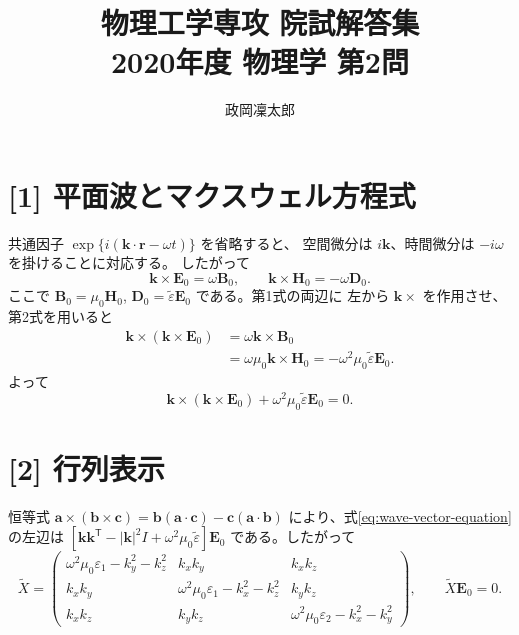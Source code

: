 \documentclass[11pt,a4paper]{article}
\title{物理工学専攻 院試解答集\\2020年度 物理学 第2問}
\author{政岡凜太郎}
\date{}
\begin{document}
\maketitle

\section*{[1] 平面波とマクスウェル方程式}
共通因子 $\exp\{i(\boldsymbol{k}\cdot\boldsymbol{r}-\omega t)\}$ を省略すると、
空間微分は $i\boldsymbol{k}$、時間微分は $-i\omega$ を掛けることに対応する。
したがって
\begin{equation}
  \boldsymbol{k}\times\boldsymbol{E}_0=\omega\boldsymbol{B}_0,
  \qquad
  \boldsymbol{k}\times\boldsymbol{H}_0=-\omega\boldsymbol{D}_0.
  \label{eq:maxwell-wave}
\end{equation}
ここで $\boldsymbol{B}_0=\mu_0\boldsymbol{H}_0$,
$\boldsymbol{D}_0=\tilde{\varepsilon}\boldsymbol{E}_0$ である。第1式の両辺に
左から $\boldsymbol{k}\times$ を作用させ、第2式を用いると
\begin{align}
 \boldsymbol{k}\times(\boldsymbol{k}\times\boldsymbol{E}_0)
 &=\omega\boldsymbol{k}\times\boldsymbol{B}_0\\
 &=\omega\mu_0\boldsymbol{k}\times\boldsymbol{H}_0
 =-\omega^2\mu_0\tilde{\varepsilon}\boldsymbol{E}_0.
\end{align}
よって
\begin{equation}
  \boldsymbol{k}\times(\boldsymbol{k}\times\boldsymbol{E}_0)
  +\omega^2\mu_0\tilde{\varepsilon}\boldsymbol{E}_0=0.
  \label{eq:wave-vector-equation}
\end{equation}

\section*{[2] 行列表示}
恒等式 $\boldsymbol{a}\times(\boldsymbol{b}\times\boldsymbol{c})
=\boldsymbol{b}(\boldsymbol{a}\cdot\boldsymbol{c})-\boldsymbol{c}(\boldsymbol{a}\cdot\boldsymbol{b})$
により、式\eqref{eq:wave-vector-equation}の左辺は
$[\boldsymbol{k}\boldsymbol{k}^{\mathsf T}-|\boldsymbol{k}|^2I+\omega^2\mu_0\tilde{\varepsilon}]\boldsymbol{E}_0$
である。したがって
\begin{equation}
 \tilde X=
 \begin{pmatrix}
  \omega^2\mu_0\varepsilon_1-k_y^2-k_z^2&k_xk_y&k_xk_z\\
  k_xk_y&\omega^2\mu_0\varepsilon_1-k_x^2-k_z^2&k_yk_z\\
  k_xk_z&k_yk_z&\omega^2\mu_0\varepsilon_2-k_x^2-k_y^2
 \end{pmatrix},
 \qquad \tilde X\boldsymbol{E}_0=0.
 \label{eq:X}
\end{equation}
\end{document}
